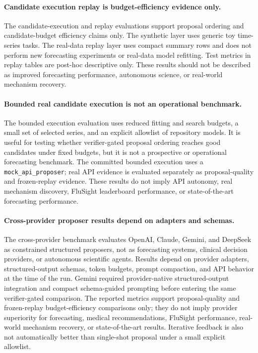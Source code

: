 \paragraph{Candidate execution replay is budget-efficiency evidence only.}
The candidate-execution and replay evaluations support proposal ordering and
candidate-budget efficiency claims only. The synthetic layer uses generic toy
time-series tasks. The real-data replay layer uses compact summary rows and
does not perform new forecasting experiments or real-data model refitting.
Test metrics in replay tables are post-hoc descriptive only. These results
should not be described as improved forecasting performance, autonomous
science, or real-world mechanism recovery.

\paragraph{Bounded real candidate execution is not an operational benchmark.}
The bounded execution evaluation uses reduced fitting and search budgets, a
small set of selected series, and an explicit allowlist of repository models.
It is useful for testing whether verifier-gated proposal ordering reaches good
candidates under fixed budgets, but it is not a prospective or operational
forecasting benchmark. The committed bounded execution uses a
\texttt{mock\_api\_proposer}; real API evidence is evaluated separately as
proposal-quality and frozen-replay evidence. These results do not imply API
autonomy, real mechanism discovery, FluSight leaderboard performance, or
state-of-the-art forecasting performance.

\paragraph{Cross-provider proposer results depend on adapters and schemas.}
The cross-provider benchmark evaluates OpenAI, Claude, Gemini, and DeepSeek as
constrained structured proposers, not as forecasting systems,
clinical decision providers, or autonomous scientific agents. Results depend
on provider adapters, structured-output schemas, token budgets, prompt
compaction, and API behavior at the time of the run. Gemini required
provider-native structured-output integration and compact schema-guided
prompting before entering the same verifier-gated comparison. The reported
metrics support proposal-quality and frozen-replay budget-efficiency
comparisons only; they do not imply provider superiority for forecasting,
medical recommendations, FluSight performance, real-world mechanism recovery,
or state-of-the-art results. Iterative feedback is also not automatically
better than single-shot proposal under a small explicit allowlist.

